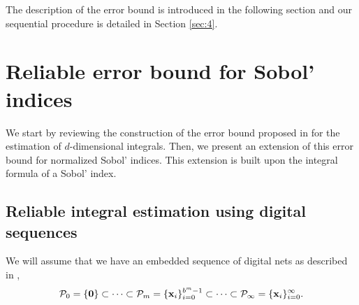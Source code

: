 The description of the error bound is introduced in the following section and our sequential procedure is detailed in Section \ref{sec:4}.


\section{Reliable error bound for Sobol' indices}
\label{sec:3} 
We start by reviewing the construction of the error bound proposed in \cite{HicJim} for the estimation of $d$-dimensional integrals. Then, we present an extension of this error bound for normalized Sobol' indices. This extension is built upon the integral formula of a Sobol' index.

\subsection{Reliable integral estimation using digital sequences}
\label{sec:3.1}

We will assume that we have an embedded sequence of digital nets  as described in \cite[Sec. 2-3]{HicJim},
\begin{equation}\label{embedded_digital}
\mathcal{P}_0=\{\boldsymbol{\mathbf{0}}\}\subset\dots\subset\mathcal{P}_m=\{\boldsymbol{\mathbf{x}}_i\}_{i=0}^{b^m-1}\subset\dots\subset\mathcal{P}_\infty=\{\boldsymbol{\mathbf{x}}_i\}_{i=0}^{\infty}.
\end{equation}

